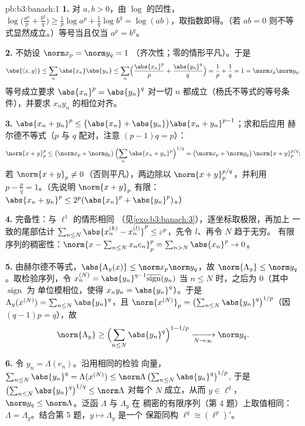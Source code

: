 \begin{solution}{pb:b3:banach:1}
\textbf{1.} 对 $a, b > 0$，由 $\log$ 的凹性，
$\log\bigl(\tfrac{a^p}p + \tfrac{b^q}q\bigr) \geq \tfrac1p\log
a^p + \tfrac1q\log b^q = \log(ab)$，取指数即得。（若 $ab = 0$
则不等式显然成立。）等号当且仅当 $a^p = b^q$。

\textbf{2.} 不妨设 $\norm x_p = \norm y_q = 1$
（齐次性；零的情形平凡）。于是
\[
\abs{\langle x, y\rangle} \leq \sum_n\abs{x_n}\abs{y_n}
\leq \sum_n\Bigl(\frac{\abs{x_n}^p}p +
\frac{\abs{y_n}^q}q\Bigr) = \frac1p + \frac1q = 1 =
\norm x_p\norm y_q .
\]
等号成立要求 $\abs{x_n}^p = \abs{y_n}^q$ 对一切 $n$
都成立（杨氏不等式的等号条件），并要求
$x_ny_n$ 的相位对齐。

\textbf{3.} $\abs{x_n + y_n}^p \leq \bigl(\abs{x_n} +
\abs{y_n}\bigr)\abs{x_n + y_n}^{p-1}$；求和后应用
赫尔德不等式（$p$ 与 $q$ 配对，注意 $(p - 1)q = p$）：
\[
\norm{x + y}_p^p \leq \bigl(\norm x_p + \norm
y_p\bigr)\,\Bigl(\sum_n\abs{x_n + y_n}^{p}\Bigr)^{1/q}
= \bigl(\norm x_p + \norm y_p\bigr)\,\norm{x+y}_p^{p/q};
\]
若 $\norm{x + y}_p \neq 0$（否则平凡），两边除以
$\norm{x+y}_p^{p/q}$，并利用 $p - \frac pq = 1$。（先说明
$\norm{x+y}_p$ 有限：$\abs{x_n+y_n}^p \leq
2^p(\abs{x_n}^p + \abs{y_n}^p)$。）

\textbf{4.} 完备性：与 $\ell^1$ 的情形相同
（见\cref{exo:b3:banach:3}），逐坐标取极限，再加上
一致的尾部估计 $\sum_{n\leq N}\abs{x^{(k)}_n - x^{(l)}_n}^p
\leq \varepsilon^p$，先令 $l$、再令 $N$ 趋于无穷。
有限序列的稠密性：$\norm{x - \sum_{n\leq
N}x_ne_n}_p^p = \sum_{n > N}\abs{x_n}^p \to 0$。

\textbf{5.} 由赫尔德不等式，$\abs{\Lambda_y(x)} \leq \norm
x_p\norm y_q$，故 $\norm{\Lambda_y} \leq \norm y_q$。取检验序列，令
$x^{(N)}_n = \abs{y_n}^{q-1}\overline{\operatorname{sign}}(y_n)$
当 $n \leq N$ 时，之后为 $0$（其中 $\operatorname{sign}$ 为
单位模相位，使得 $x_ny_n = \abs{y_n}^q$）。于是
$\Lambda_y(x^{(N)}) = \sum_{n\leq N}\abs{y_n}^q$，且
$\norm{x^{(N)}}_p = \bigl(\sum_{n\leq
N}\abs{y_n}^{q}\bigr)^{1/p}$（因 $(q-1)p = q$），故
\[
\norm{\Lambda_y} \geq \Bigl(\sum_{n\leq
N}\abs{y_n}^q\Bigr)^{1 - 1/p} \xrightarrow[N\to\infty]{}
\norm y_q .
\]

\textbf{6.} 令 $y_n = \Lambda(e_n)$。沿用相同的检验
向量，$\sum_{n \leq N}\abs{y_n}^q = \Lambda(x^{(N)}) \leq
\norm\Lambda\,\bigl(\sum_{n\leq N}\abs{y_n}^q\bigr)^{1/p}$,
于是 $\bigl(\sum_{n\leq N}\abs{y_n}^q\bigr)^{1/q} \leq
\norm\Lambda$ 对每个 $N$ 成立，从而 $y \in \ell^q$，$\norm y_q \leq
\norm\Lambda$。泛函 $\Lambda$ 与 $\Lambda_y$ 在
稠密的有限序列（第 4 题）上取值相同：$\Lambda =
\Lambda_y$。结合第 5 题，$y \mapsto \Lambda_y$ 是一个
保距同构 $\ell^q \cong (\ell^p)'$。


\end{solution}
